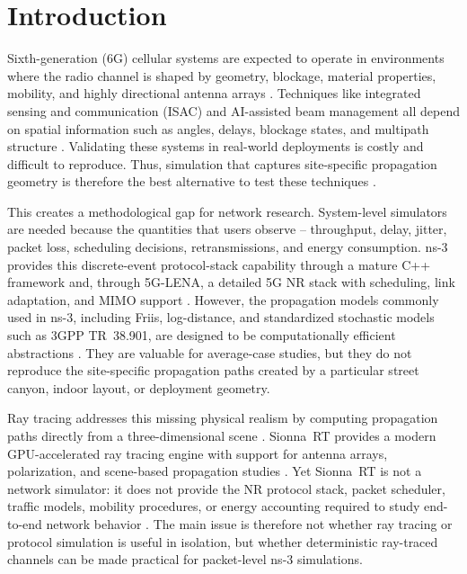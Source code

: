 \section{Introduction}

Sixth-generation (6G) cellular systems are expected to operate in environments where the radio channel is shaped by geometry, blockage, material properties, mobility, and highly directional antenna arrays \cite{tr38901,alsamman_mmwave,han_thz}.
Techniques like integrated sensing and communication (ISAC) and AI-assisted beam management all depend on spatial information such as angles, delays, blockage states, and multipath structure \cite{zhou_isac,gao_isac_mimo,cazzella_dt_mimo}.
Validating these systems in real-world deployments is costly and difficult to reproduce.
Thus, simulation that captures site-specific propagation geometry is therefore the best alternative to test these techniques \cite{cazzella_dt_mimo,bojovic_mimo}.

This creates a methodological gap for network research.
System-level simulators are needed because the quantities that users observe -- throughput, delay, jitter, packet loss, scheduling decisions, retransmissions, and energy consumption.
ns-3 provides this discrete-event protocol-stack capability through a mature C++ framework and, through 5G-LENA, a detailed 5G NR stack with scheduling, link adaptation, and MIMO support \cite{ns3,5glena}.
However, the propagation models commonly used in ns-3, including Friis, log-distance, and standardized stochastic models such as 3GPP TR~38.901, are designed to be computationally efficient abstractions \cite{tr38901,5glena}.
They are valuable for average-case studies, but they do not reproduce the site-specific propagation paths created by a particular street canyon, indoor layout, or deployment geometry.

Ray tracing addresses this missing physical realism by computing propagation paths directly from a three-dimensional scene \cite{alsamman_mmwave,han_thz,raymobtime_sionna}.
Sionna~RT provides a modern GPU-accelerated ray tracing engine with support for antenna arrays, polarization, and scene-based propagation studies \cite{sionna,sionnart}.
Yet Sionna~RT is not a network simulator: it does not provide the NR protocol stack, packet scheduler, traffic models, mobility procedures, or energy accounting required to study end-to-end network behavior \cite{sionna,sionnart,5glena}.
The main issue is therefore not whether ray tracing or protocol simulation is useful in isolation, but whether deterministic ray-traced channels can be made practical for packet-level ns-3 simulations.

